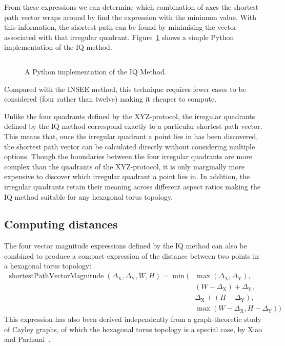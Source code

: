 			From these expressions we can determine which combination of axes the
			shortest path vector wraps around by find the expression with the minimum
			value. With this information, the shortest path can be found by
			minimising the vector associated with that irregular quadrant.  Figure~\ref{fig:iqmethod.py} shows a simple Python implementation of the IQ
			method.
			
			\begin{figure}
				\inputminted{python}{figures/iqmethod.py}
				
				\caption{A Python implementation of the IQ Method.}
				\label{fig:iqmethod.py}
			\end{figure}
			
			Compared with the INSEE method, this technique requires fewer cases to be
			considered (four rather than twelve) making it cheaper to compute.
			
			Unlike the four quadrants defined by the XYZ-protocol, the irregular
			quadrants defined by the IQ method correspond exactly to a particular
			shortest path vector. This means that, once the irregular quadrant a
			point lies in has been discovered, the shortest path vector can be
			calculated directly without considering multiple options. Though the
			boundaries between the four irregular quadrants are more complex than the
			quadrants of the XYZ-protocol, it is only marginally more expensive to
			discover which irregular quadrant a point lies in. In addition, the
			irregular quadrants retain their meaning across different aspect ratios
			making the IQ method suitable for any hexagonal torus topology.
		
		\subsection{Computing distances}
		
			The four vector magnitude expressions defined by the IQ method can also
			be combined to produce a compact expression of the distance between two
			points in a hexagonal torus topology:
			\begin{align*}
				\operatorname{shortestPathVectorMagnitude}(\Delta_\textrm{X}, \Delta_\textrm{Y}, W, H) =
				\operatorname{min}(&\operatorname{max}(\Delta_\textrm{X}, \Delta_\textrm{Y}),\\
				                   &(W - \Delta_\textrm{X}) + \Delta_\textrm{Y},\\
				                   &\Delta_\textrm{X} + (H - \Delta_\textrm{Y}),\\
				                   &\operatorname{max}(W-\Delta_\textrm{X}, H-\Delta_\textrm{Y}))
			\end{align*}
			This expression has also been derived independently from a
			graph-theoretic study of Cayley graphs, of which the hexagonal torus
			topology is a special case, by Xiao and Parhami~\cite{xiao04}.
		
